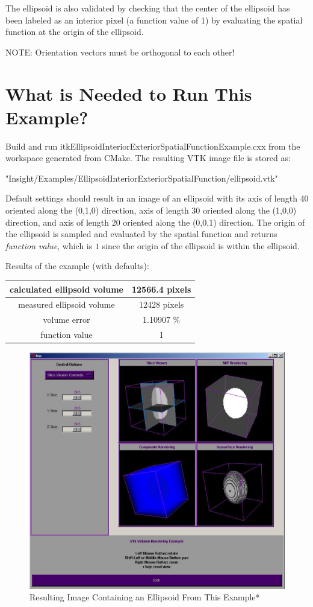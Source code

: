 \documentclass{InsightHowto}
\begin{document}
The ellipsoid is also validated by checking that the center of the ellipsoid has been
labeled as an interior pixel (a function value of 1) by evaluating the spatial function at
the origin of the ellipsoid.

NOTE: Orientation vectors must be orthogonal to each other!

\section{What is Needed to Run This Example?}

Build and run itkEllipsoidInteriorExteriorSpatialFunctionExample.cxx from the workspace
generated from CMake. The resulting VTK image file is stored as:

\begin{center}
"Insight/Examples/EllipsoidInteriorExteriorSpatialFunction/ellipsoid.vtk"
\end{center}

Default settings should result in an image of an ellipsoid with its axis of length 40
oriented along the (0,1,0) direction, axis of length 30 oriented along the (1,0,0)
direction, and axis of length 20 oriented along the (0,0,1) direction. The origin of the
ellipsoid is sampled and evaluated by the spatial function and returns \emph{function
value}, which is $1$ since the origin of the ellipsoid is within the ellipsoid.

   \begin{center}
   Results of the example (with defaults):\\
   \begin{tabular}{|c|c|}  %
   \hline            %
   calculated ellipsoid volume & 12566.4 pixels \\
   \hline
   measured ellipsoid volume & 12428 pixels \\
   \hline
   volume error & 1.10907 \% \\
   \hline
   function value  &  1 \\
   \hline
   \end{tabular}
   \end{center}

\begin{figure}[!hbp]
       \centering
       \includegraphics[width=.5\textwidth]{ellipsoid.eps}
       \caption{Resulting Image Containing an Ellipsoid From This Example* \label{Fig. 1.} }
\end{figure}
\end{document}
